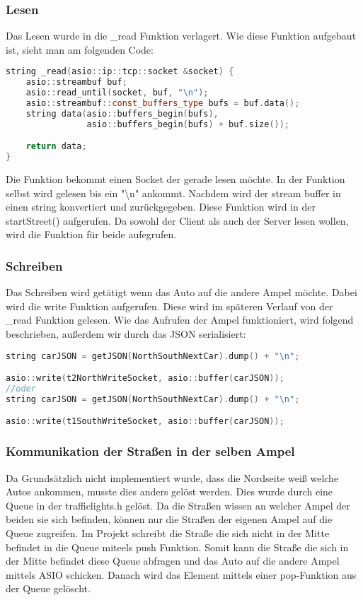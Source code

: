 \documentclass[12pt, oneside]{article}
\begin{document}
\subsubsection{Lesen}
Das Lesen wurde in die \_read Funktion verlagert. Wie diese Funktion aufgebaut ist, sieht man am folgenden Code:
\begin{lstlisting}[language=C++, caption={C++ street.cpp -Lese Funktion}]
string _read(asio::ip::tcp::socket &socket) {
    asio::streambuf buf;
    asio::read_until(socket, buf, "\n");
    asio::streambuf::const_buffers_type bufs = buf.data();
    string data(asio::buffers_begin(bufs),
                asio::buffers_begin(bufs) + buf.size());

    return data;
}
\end{lstlisting}
Die Funktion bekommt einen Socket der gerade lesen möchte. In der Funktion selbst wird gelesen bis ein "\textbackslash n" ankommt. Nachdem wird der stream buffer in einen string konvertiert und zurückgegeben. Diese Funktion wird in der startStreet() aufgerufen. Da sowohl der Client als auch der Server lesen wollen, wird die Funktion für beide aufegrufen.

\subsubsection{Schreiben}
Das Schreiben wird getätigt wenn das Auto auf die andere Ampel möchte. Dabei wird die write Funktion aufgerufen. Diese wird im späteren Verlauf von der \_read Funktion gelesen. Wie das Aufrufen der Ampel funktioniert, wird folgend beschrieben, außerdem wir durch das JSON serialisiert:
\begin{lstlisting}[language=C++, caption={C++ street.cpp - Client Verbindung}]
string carJSON = getJSON(NorthSouthNextCar).dump() + "\n";

asio::write(t2NorthWriteSocket, asio::buffer(carJSON));
//oder
string carJSON = getJSON(NorthSouthNextCar).dump() + "\n";

asio::write(t1SouthWriteSocket, asio::buffer(carJSON));
\end{lstlisting}

\subsubsection{Kommunikation der Straßen in der selben Ampel}
\label{KomSameAmpel}
Da Grundsätzlich nicht implementiert wurde, dass die Nordseite weiß welche Autos ankommen, musste dies anders gelöst werden. Dies wurde durch eine Queue in der trafficlights.h gelöst. Da die Straßen wissen an welcher Ampel der beiden sie sich befinden, können nur die Straßen der eigenen Ampel auf die Queue zugreifen. Im Projekt schreibt die Straße die sich nicht in der Mitte befindet in die Queue miteels push Funktion. Somit kann die Straße die sich in der Mitte befindet diese Queue abfragen und das Auto auf die andere Ampel mittels ASIO schicken. Danach wird das Element mittels einer pop-Funktion aus der Queue gelöscht.
 
\end{document}
